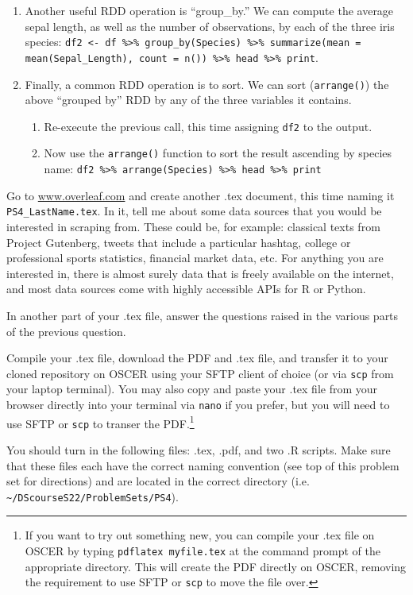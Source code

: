 \documentclass[12pt,english]{exam}
\begin{document}
\begin{questions}
\begin{enumerate}
    \item Another useful RDD operation is ``group\_by.'' We can compute the average sepal length, as well as the number of observations, by each of the three iris species: \texttt{df2 <- df \%>\% group\_by(Species) \%>\% summarize(mean  = mean(Sepal\_Length), count = n()) \%>\% head \%>\% print}.
    \item Finally, a common RDD operation is to sort. We can sort (\texttt{arrange()}) the above ``grouped by'' RDD by any of the three variables it contains.
    \begin{enumerate}
        \item Re-execute the previous call, this time assigning \texttt{df2} to the output.
        \item Now use the \texttt{arrange()} function to sort the result ascending by species name: \texttt{df2 \%>\% arrange(Species) \%>\% head \%>\% print}
    \end{enumerate}
\end{enumerate}

\question Go to \url{www.overleaf.com} and create another .tex document, this time naming it \texttt{PS4\_LastName.tex}. In it, tell me about some data sources that you would be interested in scraping from. These could be, for example: classical texts from Project Gutenberg, tweets that include a particular hashtag, college or professional sports statistics, financial market data, etc. For anything you are interested in, there is almost surely data that is freely available on the internet, and most data sources come with highly accessible APIs for R or Python.

In another part of your .tex file, answer the questions raised in the various parts of the previous question.

\question Compile your .tex file, download the PDF and .tex file, and transfer it to your cloned repository on OSCER using your SFTP client of choice (or via \texttt{scp} from your laptop terminal). You may also copy and paste your .tex file from your browser directly into your terminal via \texttt{nano} if you prefer, but you will need to use SFTP or \texttt{scp} to transer the PDF.\footnote{If you want to try out something new, you can compile your .tex file on OSCER by typing \texttt{pdflatex myfile.tex} at the command prompt of the appropriate directory. This will create the PDF directly on OSCER, removing the requirement to use SFTP or \texttt{scp} to move the file over.}

\question You should turn in the following files: .tex, .pdf,  and two .R scripts.  Make sure that these files each have the correct naming convention (see top of this problem set for directions) and are located in the correct directory (i.e. \texttt{\textasciitilde/DScourseS22/ProblemSets/PS4}).


\end{questions}
\end{document}

